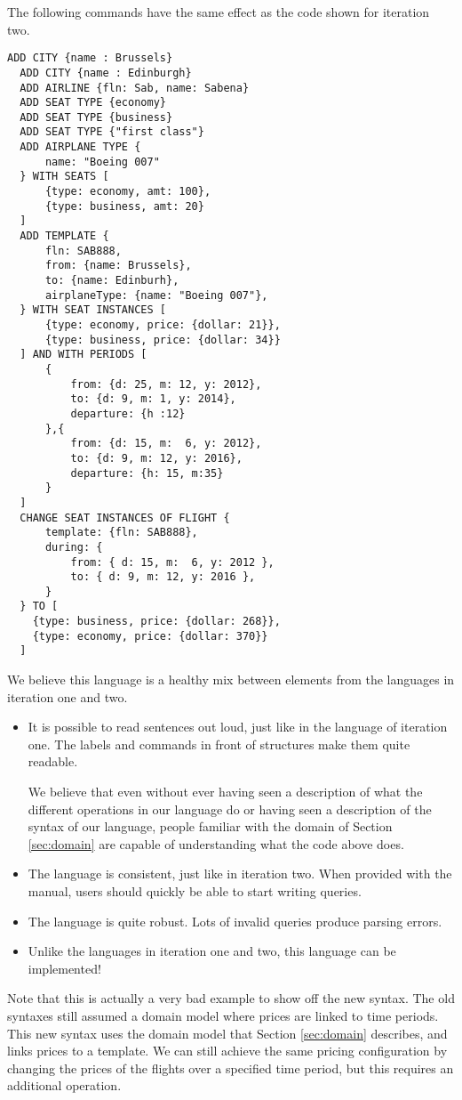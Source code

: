 The following commands have the same effect as the code shown for iteration two.
\begin{lstlisting}[language=airyscript,frame=single]
  ADD CITY {name : Brussels}
  ADD CITY {name : Edinburgh}
  ADD AIRLINE {fln: Sab, name: Sabena}
  ADD SEAT TYPE {economy}
  ADD SEAT TYPE {business}
  ADD SEAT TYPE {"first class"}
  ADD AIRPLANE TYPE {
      name: "Boeing 007"
  } WITH SEATS [
      {type: economy, amt: 100},
      {type: business, amt: 20}
  ]
  ADD TEMPLATE {
      fln: SAB888,
      from: {name: Brussels},
      to: {name: Edinburh},
      airplaneType: {name: "Boeing 007"},
  } WITH SEAT INSTANCES [
      {type: economy, price: {dollar: 21}},
      {type: business, price: {dollar: 34}}
  ] AND WITH PERIODS [
      {
          from: {d: 25, m: 12, y: 2012},
          to: {d: 9, m: 1, y: 2014},
          departure: {h :12}
      },{
          from: {d: 15, m:  6, y: 2012},
          to: {d: 9, m: 12, y: 2016},
          departure: {h: 15, m:35}
      }
  ]
  CHANGE SEAT INSTANCES OF FLIGHT {
      template: {fln: SAB888},
      during: {
          from: { d: 15, m:  6, y: 2012 },
          to: { d: 9, m: 12, y: 2016 },
      }
  } TO [
    {type: business, price: {dollar: 268}},
    {type: economy, price: {dollar: 370}}
  ]
\end{lstlisting}
We believe this language is a healthy mix between elements from the languages in
iteration one and two.
\begin{itemize}
  \item It is possible to read sentences out loud, just like in the language of
    iteration one. The labels and commands in front of structures make them
    quite readable.
    
    We believe that even without ever having seen a description of what the
    different operations in our language do or having seen a
    description of the syntax of our language, people familiar with the domain
    of Section \ref{sec:domain} are capable of understanding what the code above
    does.
  \item The language is consistent, just like in iteration two. When provided
    with the manual, users should quickly be able to start writing queries.
  \item The language is quite robust. Lots of invalid queries produce parsing
    errors.
  \item Unlike the languages in iteration one and two, this language can be
    implemented!
\end{itemize}
Note that this is actually a very bad example to show off the new syntax.  The
old syntaxes still assumed a domain model where prices are linked to time
periods. This new syntax uses the domain model that Section \ref{sec:domain}
describes, and links prices to a template. We can still achieve the same pricing
configuration by changing the prices of the flights over a specified time
period, but this requires an additional operation.


